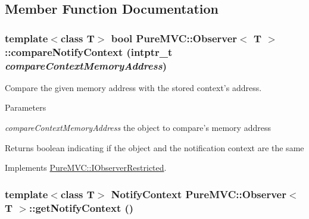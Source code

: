 \subsection{Member Function Documentation}
\hypertarget{class_pure_m_v_c_1_1_observer_a1b8be3d83deabe4c0c820af7821459a1}{
\subsubsection[{compareNotifyContext}]{\setlength{\rightskip}{0pt plus 5cm}template$<$class T$>$ bool {\bf PureMVC::Observer}$<$ T $>$::compareNotifyContext (intptr\_\-t {\em compareContextMemoryAddress})}}
\label{class_pure_m_v_c_1_1_observer_a1b8be3d83deabe4c0c820af7821459a1}


Compare the given memory address with the stored context's address. 
\begin{DoxyParams}{Parameters}
\item[{\em compareContextMemoryAddress}]the object to compare's memory address \end{DoxyParams}
\begin{DoxyReturn}{Returns}
boolean indicating if the object and the notification context are the same 
\end{DoxyReturn}


Implements \hyperlink{class_pure_m_v_c_1_1_i_observer_restricted_a773762b441d4944e77b5b53789a4c52b}{PureMVC::IObserverRestricted}.\hypertarget{class_pure_m_v_c_1_1_observer_a9d05ea77d3a20be680ea85e305643ed5}{
\subsubsection[{getNotifyContext}]{\setlength{\rightskip}{0pt plus 5cm}template$<$class T$>$ NotifyContext {\bf PureMVC::Observer}$<$ T $>$::getNotifyContext ()}}
\label{class_pure_m_v_c_1_1_observer_a9d05ea77d3a20be680ea85e305643ed5}


